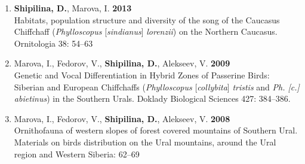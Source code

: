 \documentclass[10pt]{article}
\begin{document}
\begin{cv}
\begin{enumerate}

 \item \textbf{Shipilina, D.}, Marova, I. \textbf{2013}\\
          	Habitats, population structure and diversity of the song of the Caucasus Chiffchaff (\textit{Phylloscopus} [\textit{sindianus}] \textit{lorenzii}) on the Northern Caucasus. Ornitologia 38: 54--63 %
	
	

\item  Marova, I., Fedorov, V., \textbf{Shipilina, D.}, Alekseev, V. \textbf{2009}\\
Genetic and Vocal Differentiation in Hybrid Zones of Passerine Birds: Siberian and European Chiffchaffs (\textit{Phylloscopus} [\textit{collybita}] \textit{tristis} and \textit{Ph. [c.] abietinus}) in the Southern Urals. Doklady Biological Sciences 427: 384--386.


\item  Marova, I., Fedorov, V., \textbf{Shipilina, D.}, Alekseev, V. \textbf{2008}\\
            Ornithofauna of western slopes of forest covered mountains of Southern Ural. Materials on birds distribution on the Ural mountains, around the Ural region and Western Siberia: 62--69


\end{enumerate}
\end{cv}
\end{document}
